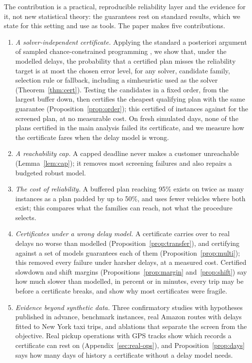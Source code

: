 \documentclass[11pt,a4paper]{article}
\theoremstyle{remark}
\begin{document}
The contribution is a practical, reproducible reliability layer and the evidence
for it, not new statistical theory: the guarantees rest on standard results, which
we state for this setting and use as tools. The paper makes five contributions.
\begin{enumerate}
\item \emph{A solver-independent certificate.} Applying the standard a posteriori
argument of sampled chance-constrained programming \citep{luedtke2008,campi2008}, we
show that, under the modelled delays, the probability that a certified plan misses
the reliability target is at most the chosen error level, for any solver, candidate
family, selection rule or fallback, including a simheuristic used as the solver
(Theorem~\ref{thm:cert}). Testing the candidates in a fixed order, from the largest
buffer down, then certifies the cheapest qualifying plan with the same guarantee
(Proposition~\ref{prop:order}); this certified \FoFixed{} of \FoInst{} instances against
\FoProc{} for the screened plan, at no measurable cost. On fresh simulated days, none of
the \CertTotal{} plans certified in the main analysis failed its certificate, and we
measure how the certificate fares when the delay model is wrong.
\item \emph{A reachability cap.} A capped deadline never makes a customer unreachable
(Lemma~\ref{lem:cap}); it removes most screening failures and also repairs a budgeted
robust model.
\item \emph{The cost of reliability.} A buffered plan reaching 95\% exists on twice as
many instances as a plan padded by up to 50\%, and uses fewer vehicles where both
exist; this compares what the families can reach, not what the procedure selects.
\item \emph{Certificates under a wrong delay model.} A certificate carries over to real
delays no worse than modelled (Proposition~\ref{prop:transfer}), and certifying against
a set of models guarantees each of them (Proposition~\ref{prop:multi}); this removed
every failure under harsher delays, at a measured cost. Certified slowdown and shift margins
(Propositions~\ref{prop:margin} and~\ref{prop:shift}) say how much slower than modelled,
in percent or in minutes, every trip may be before a certificate breaks, and show why
most certificates were fragile.
\item \emph{Evidence beyond synthetic data.} Three confirmatory studies with
hypotheses published in advance, benchmark instances, \AmzRoutes{} real Amazon routes with
delays fitted to New York taxi trips, and ablations that separate the screen from the
objective. Real pickup operations with GPS tracks show which records a certificate can
rest on (Appendix~\ref{sec:real-ops}), and Proposition~\ref{prop:days} says how many
days of history a certificate without a delay model needs.
\end{enumerate}
\end{document}
